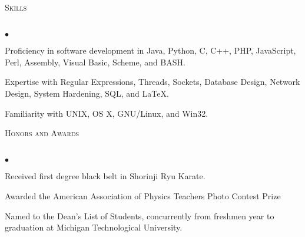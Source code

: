 \documentclass{article}
\newcommand{\lineunder}{\vspace*{-8pt} \\ \hspace*{-18pt} \hrulefill \\}
\newcommand{\header}[1]{{\hspace*{-15pt}\vspace*{6pt} \textsc{#1}} \vspace*{-6pt} \lineunder}
\newenvironment{achievements}{\begin{list}{$\bullet$}{\topsep 0pt \itemsep -2pt}}{\vspace*{4pt}\end{list}}
\begin{document}
\header{Skills}
\begin{achievements}
	\item Proficiency in software development in Java, Python, C, C++, PHP, JavaScript, Perl, Assembly, Visual Basic, Scheme, and BASH.
	\item Expertise with Regular Expressions, Threads, Sockets, Database Design, Network Design, System Hardening, SQL, and \LaTeX.
	\item Familiarity with UNIX, OS X, GNU/Linux, and Win32.
\end{achievements}

\header{Honors and Awards}
\begin{achievements}
	\item Received first degree black belt in Shorinji Ryu Karate.
	\item Awarded the American Association of Physics Teachers Photo Contest Prize
	\item Named to the Dean's List of Students, concurrently from freshmen year to graduation at Michigan Technological University.
\end{achievements}
\end{document}
